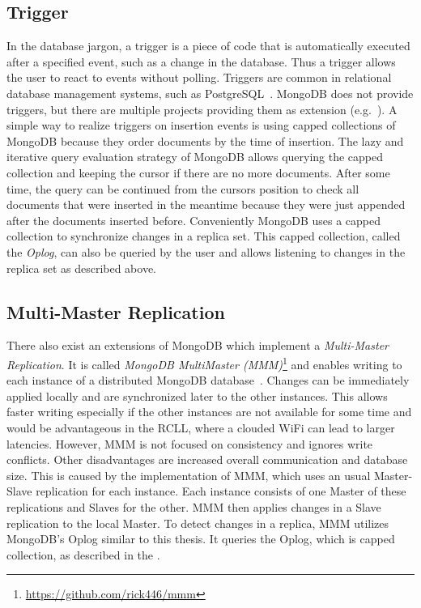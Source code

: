 \subsection{Trigger}
\label{sec:mongodb-trigger}
In the database jargon, a trigger is a piece of code that is
automatically executed after a specified event, such as a change in
the database. Thus a trigger allows the user to react to events
without polling. Triggers are common in relational database management
systems, such as PostgreSQL~\cite{postgresql}. MongoDB does not
provide triggers, but there are multiple projects providing them as
extension (e.g.~\cite{mongodb-trigger}). A simple way to realize
triggers on insertion events is using capped collections of MongoDB
because they order documents by the time of
insertion.  The lazy and
iterative query evaluation strategy of MongoDB allows querying the
capped collection and keeping the cursor if there are no more
documents. After some time, the query can be continued from the
cursors position to check all documents that were inserted in the
meantime because they were just appended after the documents inserted
before. Conveniently MongoDB uses a capped collection to synchronize
changes in a replica set. This capped collection, called the
\emph{Oplog}, can also be queried by the user and allows listening to
changes in the replica set as described above.

\subsection{Multi-Master Replication}
\label{sec:mongodb-multi-master}
There also exist an extensions of MongoDB which implement a
\emph{Multi-Master Replication}. It is called \emph{MongoDB
  MultiMaster (MMM)}\footnote{\url{https://github.com/rick446/mmm}}
and enables writing to each instance of a distributed MongoDB
database~\cite{mongodb-multi-master}. Changes can be immediately
applied locally and are synchronized later to the other
instances. This allows faster writing especially if the other
instances are not available for some time and would be advantageous in
the RCLL, where a clouded WiFi can lead to larger latencies. However,
MMM is not focused on consistency and ignores write conflicts. Other
disadvantages are increased overall communication and database
size. This is caused by the implementation of MMM, which uses an usual
Master-Slave replication for each instance. Each instance consists of
one Master of these replications and Slaves for the other. MMM then
applies changes in a Slave replication to the local Master.  To detect
changes in a replica, MMM utilizes MongoDB's Oplog similar to this
thesis. It queries the Oplog, which is capped collection, as described
in the .

